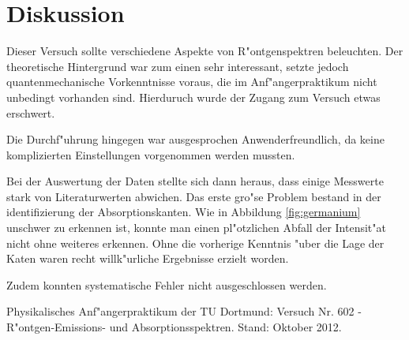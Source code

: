 \newpage
\section{Diskussion}
	\label{sec:diskussion}
	Dieser Versuch sollte verschiedene Aspekte von R"ontgenspektren beleuchten. Der theoretische Hintergrund war zum einen sehr interessant, setzte jedoch quantenmechanische Vorkenntnisse voraus, die im Anf"angerpraktikum nicht unbedingt vorhanden sind.
	Hierduruch wurde der Zugang zum Versuch etwas erschwert.

	Die Durchf"uhrung hingegen war ausgesprochen Anwenderfreundlich, da keine komplizierten Einstellungen vorgenommen werden mussten.

	Bei der Auswertung der Daten stellte sich dann heraus, dass einige Messwerte stark von Literaturwerten abwichen.
	Das erste gro"se Problem bestand in der identifizierung der Absorptionskanten.
	Wie in Abbildung \ref{fig:germanium} unschwer zu erkennen ist, konnte man einen pl"otzlichen Abfall der Intensit"at nicht ohne weiteres erkennen.
	Ohne die vorherige Kenntnis "uber die Lage der Katen waren recht willk"urliche Ergebnisse erzielt worden.

	Zudem konnten systematische Fehler nicht ausgeschlossen werden.
	
\begin{thebibliography}{9}
	 Physikalisches Anf"angerpraktikum der TU Dortmund: Versuch Nr. 602 - R"ontgen-Emissions- und Absorptionsspektren. Stand: Oktober 2012.
\end{thebibliography}